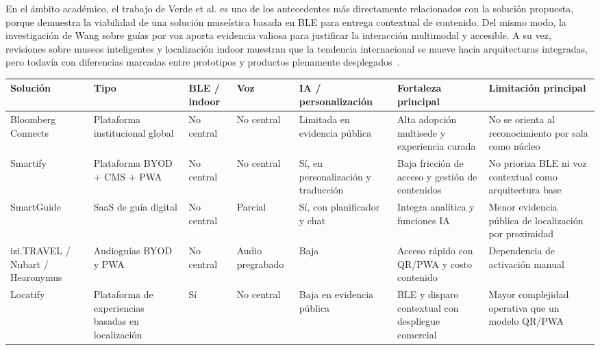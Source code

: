 En el ámbito académico, el trabajo de Verde et al. es uno de los antecedentes más directamente relacionados con la solución propuesta, porque demuestra la viabilidad de una solución museística basada en BLE para entrega contextual de contenido. Del mismo modo, la investigación de Wang sobre guías por voz aporta evidencia valiosa para justificar la interacción multimodal y accesible. A su vez, revisiones sobre museos inteligentes y localización indoor muestran que la tendencia internacional se mueve hacia arquitecturas integradas, pero todavía con diferencias marcadas entre prototipos y productos plenamente desplegados~\cite{verde2023blemuseum,wang2024voiceguide,ivanov2025smartmuseums,leitch2023indoor}.

\begin{table}[h!]
	\centering
	\footnotesize
	\setlength{\tabcolsep}{3pt}
	\begin{tabular}{>{\raggedright\arraybackslash}p{2.5cm} >{\raggedright\arraybackslash}p{2.0cm} >{\raggedright\arraybackslash}p{1.4cm} >{\raggedright\arraybackslash}p{1.2cm} >{\raggedright\arraybackslash}p{1.7cm} >{\raggedright\arraybackslash}p{2.3cm} >{\raggedright\arraybackslash}p{2.3cm}}
		\hline
		\textbf{Solución} & \textbf{Tipo} & \textbf{BLE / indoor} & \textbf{Voz} & \textbf{IA / personalización} & \textbf{Fortaleza principal} & \textbf{Limitación principal} \\
		\hline
		Bloomberg Connects & Plataforma institucional global & No central & No central & Limitada en evidencia pública & Alta adopción multisede y experiencia curada & No se orienta al reconocimiento por sala como núcleo \\
		Smartify & Plataforma BYOD + CMS + PWA & No central & No central & Sí, en personalización y traducción & Baja fricción de acceso y gestión de contenidos & No prioriza BLE ni voz contextual como arquitectura base \\
		SmartGuide & SaaS de guía digital & No central & Parcial & Sí, con planificador y chat & Integra analítica y funciones IA & Menor evidencia pública de localización por proximidad \\
		izi.TRAVEL / Nubart / Hearonymus & Audioguías BYOD y PWA & No central & Audio pregrabado & Baja & Acceso rápido con QR/PWA y costo contenido & Dependencia de activación manual \\
		Locatify & Plataforma de experiencias basadas en localización & Sí & No central & Baja en evidencia pública & BLE y disparo contextual con despliegue comercial & Mayor complejidad operativa que un modelo QR/PWA \\

\end{tabular}
\end{table}
